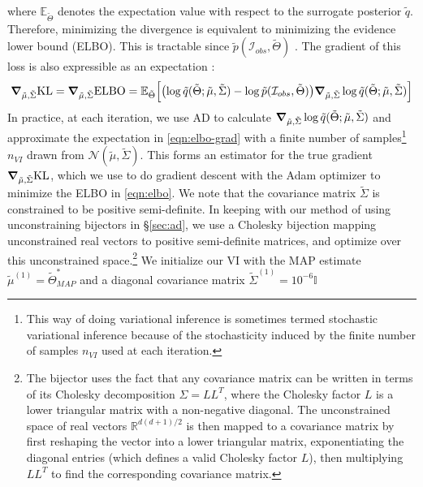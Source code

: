 where $\mathbb{E}_{\tilde{\Theta}}$ denotes the expectation value with respect to the surrogate posterior $\tilde{q}$. 
Therefore, minimizing the \kl divergence is equivalent to minimizing the evidence lower bound (ELBO). 
This is tractable since $\tilde{p}(\mathcal{I}_{obs},\tilde{\Theta})$ . The gradient of this loss is also expressible as an expectation \citep{ranganath2013}:
\begin{equation}
    \grad_{\tilde{\mu}, \tilde{\Sigma}} \kl = \grad_{\tilde{\mu}, \tilde{\Sigma}} \text{ELBO} = \mathbb{E}_{\tilde{\Theta}}\qty[\qty(\log \tilde{q}(\tilde{\Theta}; \tilde{\mu}, \tilde{\Sigma})-\log \tilde{p}(\mathcal{I}_{obs}, \tilde{\Theta})) \grad_{\tilde{\mu},\tilde{\Sigma}} \log \tilde{q}(\tilde{\Theta}; \tilde{\mu}, \tilde{\Sigma})] \label{eqn:elbo-grad}
\end{equation}
In practice, at each iteration, we use AD to calculate $\grad_{\tilde{\mu},\tilde{\Sigma}} \log \tilde{q}(\tilde{\Theta}; \tilde{\mu}, \tilde{\Sigma})$ and approximate the expectation in \cref{eqn:elbo-grad} with a finite number of samples\footnote{This way of doing variational inference is sometimes termed stochastic variational inference \citep{hoffman2013} because of the stochasticity induced by the finite number of samples $n_{VI}$ used at each iteration.} $n_{VI}$ drawn from $\mathcal{N}(\tilde{\mu}, \tilde{\Sigma})$. This forms an estimator for the true gradient $\grad_{\tilde{\mu},\tilde{\Sigma}} \normalfont \text{KL}$, which we use to do gradient descent with the Adam optimizer to minimize the ELBO in \cref{eqn:elbo}.
We note that the covariance matrix $\tilde{\Sigma}$ is constrained to be positive semi-definite. In keeping with our method of using unconstraining bijectors in \S\ref{sec:ad}, we use a Cholesky bijection mapping unconstrained real vectors to positive semi-definite matrices, and optimize over this unconstrained space.\footnote{The bijector uses the fact that any covariance matrix can be written in terms of its Cholesky decomposition $\Sigma=L L^T$, where the Cholesky factor $L$ is a lower triangular matrix with a non-negative diagonal. The unconstrained space of real vectors $\mathbb{R}^{d(d+1)/2}$ is then mapped to a covariance matrix by first reshaping the vector into a lower triangular matrix, exponentiating the diagonal entries (which defines a valid Cholesky factor $L$), then multiplying $LL^T$ to find the corresponding covariance matrix.} We initialize our VI with the MAP estimate $\tilde{\mu}^{(1)}=\tilde{\Theta}^*_{MAP}$ and a diagonal covariance matrix $\tilde{\Sigma}^{(1)}=10^{-6} \mathbb{I}$
